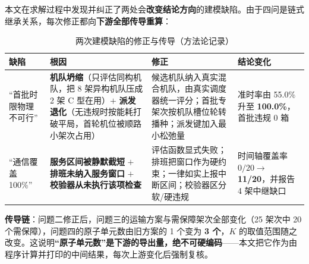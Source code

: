 本文在求解过程中发现并纠正了两处会\textbf{改变结论方向}的建模缺陷。由于四问是链式继承关系，每次修正都向\textbf{下游全部传导重算}：

\begin{table}[htbp]
	\caption{两次建模缺陷的修正与传导（方法论记录）}
	\label{tab:changes}
	\centering
	\begin{tabular}{p{2.4cm}p{4.6cm}p{4.4cm}p{2.9cm}}
		\toprule
		缺陷 & 根因 & 修正 & 结论变化 \\
		\midrule
		“首批时限物理不可行”
		& \textbf{机队坍缩}（只评估同构机队，把 8 架异构机队压成 2 架 C 型在用）$+$ \textbf{派发退化}（无违规时按能耗打破平局，首轮机位被顺路小架次占用）
		& 候选机队纳入真实混合机队，由真实调度器统一评分；首批专架次按机队槽位轮转播种；派发键加入最小松弛量
		& 准时率由 55.0\% 升至 \textbf{100.0\%}，首批违规 0 箱 \\
		“通信覆盖 100\%”
		& \textbf{服务区间被静默截短} $+$ \textbf{排班未纳入服务窗口} $+$ \textbf{校验器从未执行该项检查}
		& 评估函数显式失败；排班把窗口作为硬约束；一律如实上报中断区间；校验器区分软/硬违规
		& 时间轴覆盖率 $0/20\to$ \textbf{11/20}，并报告 4 架中继缺口 \\		\bottomrule
	\end{tabular}
\end{table}

\textbf{传导链}：问题二修正后，问题三的运输方案与需保障架次全部变化（25 架次中 20 个需保障），问题四的原子单元数由旧方案的 1 个变为 \textbf{3 个}，$K$ 的取值范围随之改变。这说明\textbf{“原子单元数”是下游的导出量，绝不可硬编码}——本文把它作为由程序计算并打印的中间结果，每次上游变化后强制复核。
